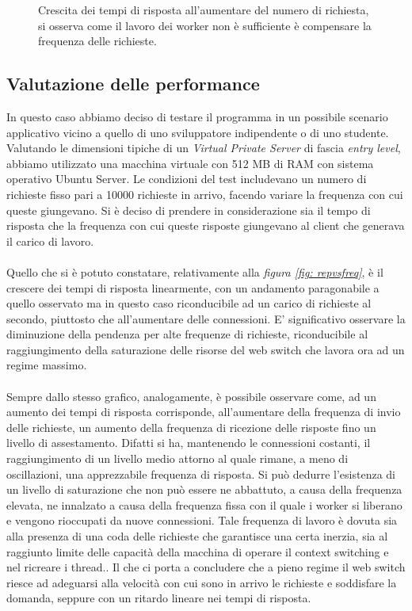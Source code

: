 \documentclass[italian]{tktltiki2}
\begin{document}
\begin{figure}[H]
\caption{Crescita dei tempi di risposta all'aumentare del numero di richiesta, si osserva come il lavoro dei worker non è sufficiente è compensare la frequenza delle richieste. \label{fig: cfr_reply_time2}}
\end{figure}
\subsection{Valutazione delle performance}
In questo caso abbiamo deciso di testare il programma in un possibile scenario applicativo vicino a quello di uno sviluppatore indipendente o di uno studente. Valutando le dimensioni tipiche di un \emph{Virtual Private Server} di fascia \emph{entry level}, abbiamo utilizzato una macchina virtuale con 512 MB di RAM con sistema operativo Ubuntu Server. Le condizioni del test includevano un numero di richieste fisso pari a 10000 richieste in arrivo, facendo variare la frequenza con cui queste giungevano. Si è deciso di prendere in considerazione sia il tempo di risposta che la frequenza con cui queste risposte giungevano al client che generava il carico di lavoro. \\\\ 
Quello che si è potuto constatare, relativamente alla \emph{figura \ref{fig: repvsfreq}}, è il crescere dei tempi di risposta linearmente, con un andamento paragonabile a quello osservato ma in questo caso riconducibile ad un carico di richieste al secondo, piuttosto che all'aumentare delle connessioni. E' significativo osservare la diminuzione della pendenza per alte frequenze di richieste, riconducibile al raggiungimento della saturazione delle risorse del web switch che lavora ora ad un regime massimo.\\\\
Sempre dallo stesso grafico, analogamente, è possibile osservare come, ad un aumento dei tempi di risposta corrisponde, all'aumentare della frequenza di invio delle richieste, un aumento della frequenza di ricezione delle risposte fino un livello di assestamento. Difatti si ha, mantenendo le connessioni costanti, il raggiungimento di un livello medio attorno al quale rimane, a meno di oscillazioni, una apprezzabile frequenza di risposta. Si può dedurre l'esistenza di un livello di saturazione che non può essere ne abbattuto, a causa della frequenza elevata, ne innalzato a causa della frequenza fissa con il quale i worker si liberano e vengono rioccupati da nuove connessioni. Tale frequenza di lavoro è dovuta sia alla presenza di una coda delle richieste che garantisce una certa inerzia, sia al raggiunto limite delle capacità della macchina di operare il context switching e nel ricreare i thread.. Il che ci porta a concludere che a pieno regime il web switch riesce ad adeguarsi alla velocità con cui sono in arrivo le richieste e soddisfare la domanda, seppure con un ritardo lineare nei tempi di risposta.
\end{document}
